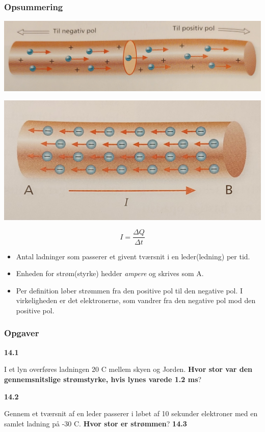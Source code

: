 \documentclass[11pt]{article}
\begin{document}
\subsubsection*{Opsummering}
\label{sec:org3980df7}
\begin{center}
\includegraphics[width=.9\linewidth]{./img/stroem_01.jpg}
\end{center}
\begin{center}
\includegraphics[width=.9\linewidth]{./img/stroem_02.jpg}
\end{center}
$$\boxed{I = \frac{\Delta Q}{\Delta t}}$$
\begin{itemize}
\item Antal ladninger som passerer et givent tværsnit i en leder(ledning) per tid.
\item Enheden for strøm(styrke) hedder \emph{ampere} og skrives som A.
\item Per definition løber strømmen fra den positive pol til den negative pol. I virkeligheden er det elektronerne, som vandrer fra den negative pol mod den positive pol.
\end{itemize}

\subsubsection*{Opgaver}
\label{sec:org740e03a}
\textbf{14.1}

I et lyn overføres ladningen 20 C mellem skyen og Jorden. \textbf{Hvor stor var den gennemsnitslige strømstyrke, hvis lynes varede 1.2 ms}?

\textbf{14.2}

Gennem et tværsnit af en leder passerer i løbet af 10 sekunder elektroner med en samlet ladning på -30 C. \textbf{Hvor stor er strømmen}?
\textbf{14.3}
\end{document}

